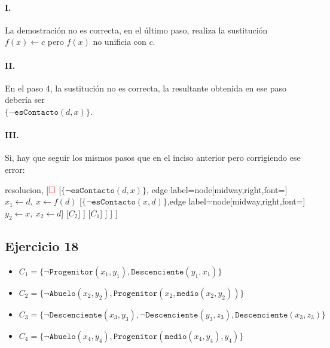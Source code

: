 \documentclass[10pt,a4paper]{article}
\begin{document}
\paragraph{I.} La demostración no es correcta, en el último paso, realiza la sustitución $f(x)\leftarrow c$ pero $f(x)$ no unificia con $c$.

\paragraph{II.} En el paso 4, la sustitución no es correcta, la resultante obtenida en ese paso debería ser \\ $\{\lnot\texttt{esContacto}(d,x)\}$.

\paragraph{III.} Si, hay que seguir los mismos pasos que en el inciso anterior pero corrigiendo ese error:

\begin{center}
	\begin{forest} resolucion,
[${\color{red}\Box}$ 
                	[$\{\lnot\texttt{esContacto}(d \comma x)\}$, edge label={node[midway,right,font=\footnotesize] {$x_1\leftarrow d,~x\leftarrow f(d)$}}
                    	[$\{\lnot \texttt{esContacto}(x\comma d)\}$,edge label={node[midway,right,font=\footnotesize] {$y_2\leftarrow x,~x_2\leftarrow d$}}]
                    	[$C_2$]
                	]
                	[$C_1$]
            	]
        	]
]
	\end{forest}
\end{center}

\subsection{Ejercicio 18}
    \begin{itemize}
        \item $C_1 = \{ \lnot \texttt{Progenitor}(x_1,y_1),\texttt{Descenciente}(y_1,x_1)\}$ 
         \item $C_2 =\{ \lnot \texttt{Abuelo}(x_2,y_2), \texttt{Progenitor}(x_2, \texttt{medio}(x_2,y_2))\}$ 
        \item $C_3 = \{ \lnot \texttt{Descenciente}(x_3,y_3), \lnot \texttt{Descenciente}(y_3,z_3), \texttt{Descenciente}(x_3,z_3)\}$ 
        \item $C_4 =\{ \lnot \texttt{Abuelo}(x_4,y_4), \texttt{Progenitor}(\texttt{medio}(x_4,y_4),y_4)\}$ 
     \end{itemize}
\end{document}
